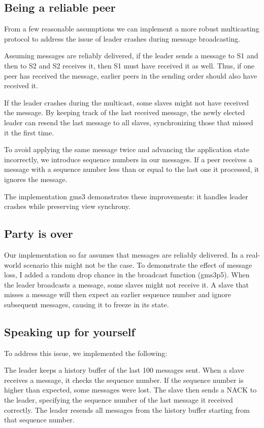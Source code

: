 \documentclass[a4paper, 11pt]{article}
\begin{document}
\subsection{Being a reliable peer}
From a few reasonable assumptions we can implement a more robust multicasting protocol to address the issue of leader crashes during message broadcasting.

Assuming messages are reliably delivered, if the leader sends a message to S1 and then to S2 and S2 receives it, then S1 must have received it as well. Thus, if one peer has received the message, earlier peers in the sending order should also have received it.

If the leader crashes during the multicast, some slaves might not have received the message. By keeping track of the last received message, the newly elected leader can resend the last message to all slaves, synchronizing those that missed it the first time.

To avoid applying the same message twice and advancing the application state incorrectly, we introduce sequence numbers in our messages. If a peer receives a message with a sequence number less than or equal to the last one it processed, it ignores the message.

The implementation gms3 demonstrates these improvements: it handles leader crashes while preserving view synchrony.

\subsection{Party is over}
Our implementation so far assumes that messages are reliably delivered. In a real-world scenario this might not be the case. To demonstrate the effect of message loss, I added a random drop chance in the broadcast function (gms3p5). When the leader broadcasts a message, some slaves might not receive it. A slave that misses a message will then expect an earlier sequence number and ignore subsequent messages, causing it to freeze in its state.

\subsection{Speaking up for yourself}
To address this issue, we implemented the following:

The leader keeps a history buffer of the last 100 messages sent. When a slave receives a message, it checks the sequence number. If the sequence number is higher than expected, some messages were lost. The slave then sends a NACK to the leader, specifying the sequence number of the last message it received correctly. The leader resends all messages from the history buffer starting from that sequence number.
\end{document}
